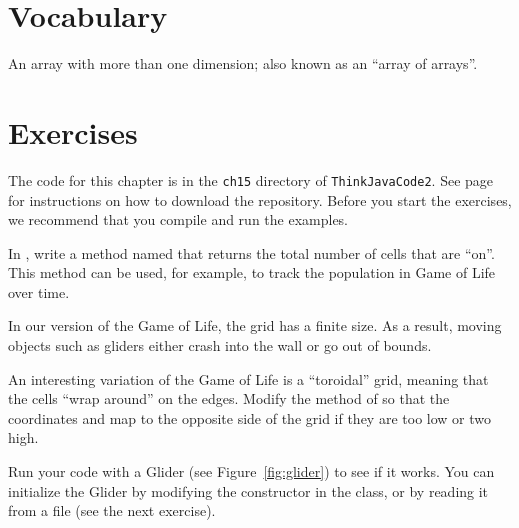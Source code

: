 \section{Vocabulary}


\begin{description}

An array with more than one dimension; also known as an ``array of arrays''.


\end{description}


\section{Exercises}

The code for this chapter is in the {\tt ch15} directory of {\tt ThinkJavaCode2}.
See page~\pageref{code} for instructions on how to download the repository.
Before you start the exercises, we recommend that you compile and run the examples.


\begin{exercise}
In , write a method named  that returns the total number of cells that are ``on''.
This method can be used, for example, to track the population in Game of Life over time.
\end{exercise}


\begin{exercise}
In our version of the Game of Life, the grid has a finite size.
As a result, moving objects such as gliders either crash into the wall or go out of bounds.

An interesting variation of the Game of Life is a ``toroidal'' grid, meaning that the cells ``wrap around'' on the edges.
Modify the  method of  so that the coordinates  and  map to the opposite side of the grid if they are too low or two high.

Run your code with a Glider (see Figure~\ref{fig:glider}) to see if it works.
You can initialize the Glider by modifying the constructor in the  class, or by reading it from a file (see the next exercise).
\end{exercise}



